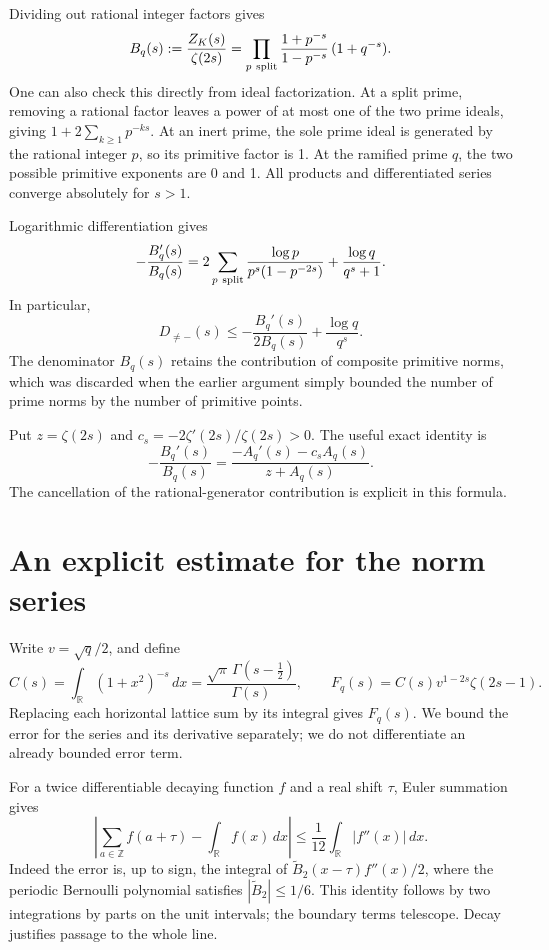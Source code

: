 \documentclass[11pt]{article}
\newcommand{\Z}{\mathbb Z}
\begin{document}
Dividing out rational integer factors gives
\begin{equation}\label{primitive-euler}
 B_q(s):=\frac{Z_K(s)}{\zeta(2s)}
 =\prod_{p\ {\rm split}}\frac{1+p^{-s}}{1-p^{-s}}\,(1+q^{-s}).
\end{equation}
One can also check this directly from ideal factorization. At a split
prime, removing a rational factor leaves a power of at most one of the
two prime ideals, giving \(1+2\sum_{k\ge1}p^{-ks}\).
At an inert prime, the sole prime ideal is generated by the rational
integer \(p\), so its primitive factor is 1. At the ramified prime \(q\),
the two possible primitive exponents are 0 and 1.
All products and differentiated series converge absolutely for \(s>1\).

Logarithmic differentiation gives
\[
 -\frac{B_q'(s)}{B_q(s)}
 =2\sum_{p\ {\rm split}}\frac{\log p}{p^s(1-p^{-2s})}
   +\frac{\log q}{q^s+1}.
\]
In particular,
\begin{equation}\label{euler-upper-start}
 D_{\ne-}(s)\le-\frac{B_q'(s)}{2B_q(s)}
                         +\frac{\log q}{q^s}.
\end{equation}
The denominator \(B_q(s)\) retains the contribution of composite
primitive norms, which was discarded when the earlier argument simply
bounded the number of prime norms by the number of primitive points.

Put \(z=\zeta(2s)\) and \(c_s=-2\zeta'(2s)/\zeta(2s)>0\).
The useful exact identity is
\begin{equation}\label{logderivative}
 -\frac{B_q'(s)}{B_q(s)}
 =\frac{-A_q'(s)-c_s A_q(s)}{z+A_q(s)}.
\end{equation}
The cancellation of the rational-generator contribution is explicit
in this formula.

\section{An explicit estimate for the norm series}\label{norm-series}

Write \(v=\sqrt q/2\), and define
\[
 C(s)=\int_{\mathbb R}(1+x^2)^{-s}\,dx
 =\frac{\sqrt\pi\,\Gamma(s-\tfrac12)}{\Gamma(s)},\qquad
 F_q(s)=C(s)v^{1-2s}\zeta(2s-1).
\]
Replacing each horizontal lattice sum by its integral gives \(F_q(s)\).
We bound the error for the series and its derivative separately; we
do not differentiate an already bounded error term.

For a twice differentiable decaying function \(f\) and a real shift
\(\tau\), Euler summation gives
\begin{equation}\label{summation-error}
 \left|\sum_{a\in\Z}f(a+\tau)-\int_{\mathbb R}f(x)\,dx\right|
 \le\frac1{12}\int_{\mathbb R}|f''(x)|\,dx.
\end{equation}
Indeed the error is, up to sign, the integral of
\(\widetilde B_2(x-\tau)f''(x)/2\), where the periodic Bernoulli
polynomial satisfies \(|\widetilde B_2|\le1/6\).
This identity follows by two integrations by parts on the unit
intervals; the boundary terms telescope. Decay justifies passage to
the whole line.
\end{document}
